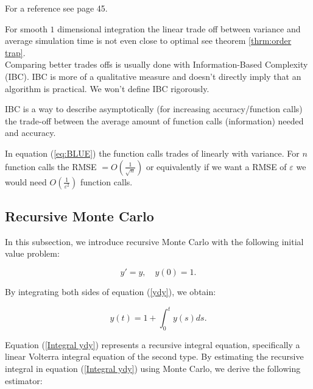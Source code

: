 \documentclass[a4paper,12pt]{article}
\begin{document}
\begin{related}
    For a reference see \cite{veach_robust_1997} page 45.
\end{related}

For smooth $1$ dimensional integration the linear trade off between
variance and average simulation time is not even close to optimal see
theorem \ref{thrm:order trap}. \\
Comparing better trades offs is usually done with Information-Based Complexity (IBC).
IBC is more of a qualitative measure and doesn't directly imply
that an algorithm is practical. We won't define IBC rigorously.

\begin{definition}
    IBC is a way to describe asymptotically (for increasing accuracy/function calls)
    the trade-off between the average amount of function calls (information)
    needed and accuracy.
\end{definition}

\begin{example}
    In equation (\ref{eq:BLUE}) the function calls trades of
    linearly with variance. For $n$ function calls
    the RMSE $= O\left(\frac{1}{\sqrt{n}}\right)$ or equivalently if we want a
    RMSE of $\varepsilon$ we would need $O\left(\frac{1}{\varepsilon^{2}}\right)$
    function calls.
\end{example}


\subsection{Recursive Monte Carlo}
In this subsection, we introduce recursive Monte Carlo
with the following  initial value problem:

\begin{equation} \label{ydy}
    y' = y, \quad y(0) = 1.
\end{equation}

By integrating both sides of equation (\ref{ydy}), we obtain:

\begin{equation} \label{Integral ydy}
    y(t) = 1 + \int_{0}^{t} y(s) ds.
\end{equation}

Equation (\ref{Integral ydy}) represents a recursive integral equation,
specifically a linear Volterra integral equation of the second type.
By estimating the recursive integral in equation (\ref{Integral ydy})
using Monte Carlo, we derive the following estimator:
\end{document}
